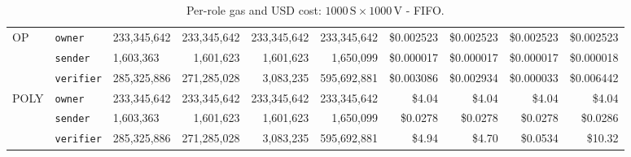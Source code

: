 \begin{table}
{\begin{tabular}{|ll |lrrr| rrrr|}
            \hline
            \multirow{3}{*}{OP}   & \texttt{owner}    & 233,345,642 & 233,345,642 & 233,345,642 & 233,345,642 & \$0.002523 & \$0.002523 & \$0.002523 & \$0.002523 \\
            & \texttt{sender}   & 1,603,363   & 1,601,623   & 1,601,623   & 1,650,099   & \$0.000017 & \$0.000017 & \$0.000017 & \$0.000018 \\
            & \texttt{verifier} & 285,325,886 & 271,285,028 & 3,083,235   & 595,692,881 & \$0.003086 & \$0.002934 & \$0.000033 & \$0.006442 \\
            \hline
            \multirow{3}{*}{POLY} & \texttt{owner}    & 233,345,642 & 233,345,642 & 233,345,642 & 233,345,642 & \$4.04     & \$4.04     & \$4.04     & \$4.04     \\
            & \texttt{sender}   & 1,603,363   & 1,601,623   & 1,601,623   & 1,650,099   & \$0.0278   & \$0.0278   & \$0.0278   & \$0.0286   \\
            & \texttt{verifier} & 285,325,886 & 271,285,028 & 3,083,235   & 595,692,881 & \$4.94     & \$4.70     & \$0.0534   & \$10.32    \\
            \hline
        \end{tabular}%
    }
    \caption{Per-role gas and USD cost: $1000\,\text{S} \times 1000\,\text{V}$ - FIFO.}
    \label{tab:proto-evaluation-merged-fifo}
\end{table}

